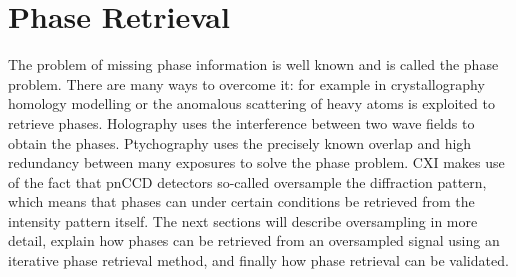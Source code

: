 \chapter{Phase Retrieval}
The problem of missing phase information is well known and is called the phase problem. There are many ways to overcome it: for example in crystallography homology modelling or the anomalous scattering of heavy atoms is exploited to retrieve phases. Holography uses the interference between two wave fields to obtain the phases. Ptychography uses the precisely known overlap and high redundancy between many exposures to solve the phase problem. CXI makes use of the fact that pnCCD detectors so-called oversample the diffraction pattern, which means that phases can under certain conditions be retrieved from the intensity pattern itself. The next sections will describe oversampling in more detail, explain how phases can be retrieved from an oversampled signal using an iterative phase retrieval method, and finally how phase retrieval can be validated. 


